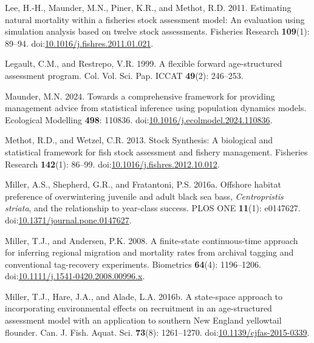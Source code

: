 \documentclass[
]{article}
\newlength{\cslhangindent}
\newlength{\cslentryspacingunit} %
\newenvironment{CSLReferences}[2] %
 {%
  \setlength{\parindent}{0pt}
  \ifodd #1
  \let\oldpar\par
  \def\par{\hangindent=\cslhangindent\oldpar}
  \fi
  \setlength{\parskip}{#2\cslentryspacingunit}
 }%
 {}
\begin{document}
\begin{CSLReferences}{1}{0}
\leavevmode{}%
Lee, H.-H., Maunder, M.N., Piner, K.R., and Methot, R.D. 2011.
Estimating natural mortality within a fisheries stock assessment model:
An evaluation using simulation analysis based on twelve stock
assessments. Fisheries Research \textbf{109}(1): 89--94.
doi:\href{https://doi.org/10.1016/j.fishres.2011.01.021}{10.1016/j.fishres.2011.01.021}.

\leavevmode{}%
Legault, C.M., and Restrepo, V.R. 1999. A flexible forward
age-structured assessment program. Col. Vol. Sci. Pap. ICCAT
\textbf{49}(2): 246--253.

\leavevmode{}%
Maunder, M.N. 2024. Towards a comprehensive framework for providing
management advice from statistical inference using population dynamics
models. Ecological Modelling \textbf{498}: 110836.
doi:\href{https://doi.org/10.1016/j.ecolmodel.2024.110836}{10.1016/j.ecolmodel.2024.110836}.

\leavevmode{}%
Methot, R.D., and Wetzel, C.R. 2013. Stock {S}ynthesis: A biological and
statistical framework for fish stock assessment and fishery management.
Fisheries Research \textbf{142}(1): 86--99.
doi:\href{https://doi.org/10.1016/j.fishres.2012.10.012}{10.1016/j.fishres.2012.10.012}.

\leavevmode{}%
Miller, A.S., Shepherd, G.R., and Fratantoni, P.S. 2016a. Offshore
habitat preference of overwintering juvenile and adult black sea bass,
\emph{{C}entropristis} \emph{striata}, and the relationship to
year-class success. {PLOS} {ONE} \textbf{11}(1): e0147627.
doi:\href{https://doi.org/10.1371/journal.pone.0147627}{10.1371/journal.pone.0147627}.

\leavevmode{}%
Miller, T.J., and Andersen, P.K. 2008. A finite-state continuous-time
approach for inferring regional migration and mortality rates from
archival tagging and conventional tag-recovery experiments. Biometrics
\textbf{64}(4): 1196--1206.
doi:\href{https://doi.org/10.1111/j.1541-0420.2008.00996.x}{10.1111/j.1541-0420.2008.00996.x}.

\leavevmode{}%
Miller, T.J., Hare, J.A., and Alade, L.A. 2016b. A state-space approach
to incorporating environmental effects on recruitment in an
age-structured assessment model with an application to southern {New
England} yellowtail flounder. Can. J. Fish. Aquat. Sci. \textbf{73}(8):
1261--1270.
doi:\href{https://doi.org/10.1139/cjfas-2015-0339}{10.1139/cjfas-2015-0339}.


\end{CSLReferences}
\end{document}
